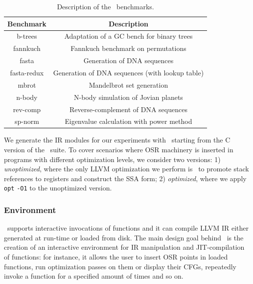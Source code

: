 \begin{table}[ht]
\begin{center}
\begin{small}
    \begin{tabular}{ |c|c| }
        \hline
        Benchmark & Description \\
        \hline
        \hline
        b-trees & Adaptation of a GC bench for binary trees \\
        \hline
        fannkuch & Fannkuch benchmark on permutations \\
        \hline
        fasta & Generation of DNA sequences \\
        \hline
        fasta-redux & Generation of DNA sequences (with lookup table) \\
        \hline
        mbrot & Mandelbrot set generation \\
        \hline
        n-body & N-body simulation of Jovian planets \\
        \hline
        rev-comp & Reverse-complement of DNA sequences \\
        \hline
        sp-norm & Eigenvalue calculation with power method \\
        \hline
    \end{tabular}
\end{small}
\end{center}
\caption{\label{tab:osr-shootout} Description of the \shootout\ benchmarks.}
\end{table}

We generate the IR modules for our experiments with \clang\ starting from the C version of the \shootout\ suite. To cover scenarios where OSR machinery is inserted in programs with different optimization levels, we consider two versions: 1) {\em unoptimized}, where the only LLVM optimization we perform is \memtoreg\ to promote stack references to registers and construct the SSA form; 2) {\em optimized}, where we apply {\tt opt} {\tt -O1} to the unoptimized version.

\subsubsection*{Environment}
\tinyvm\ supports interactive invocations of functions and it can compile LLVM IR either generated at run-time or loaded from disk. The main design goal behind \tinyvm\ is the creation of an interactive environment for IR manipulation and JIT-compilation of functions: for instance, it allows the user to insert OSR points in loaded functions, run optimization passes on them or display their CFGs, repeatedly invoke a function for a specified amount of times and so on.

